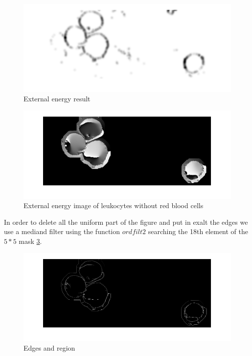 \begin{figure}
	\begin{center}
		\centering
		\includegraphics[scale=0.5]{img/Eext.png}
		\caption{External energy result}
		\label{fig:Eextforce}
	\end{center}
\end{figure}
\begin{figure}
	\begin{center}
		\centering
		\includegraphics[scale=0.5]{img/onlyleuco.png}
		\caption{External energy image of leukocytes without red blood cells}
		\label{fig:onlyleu}
	\end{center}
\end{figure}
\bigskip

In order to delete all the uniform part of the figure and put in exalt the edges we use a mediand filter using the function $ordfilt2$ searching the 18th element of the $5 * 5$ mask \ref{fig:Pmedonlyleu}.

\begin{figure}
	\begin{center}
		\centering
		\includegraphics[scale=0.5]{img/Pmedonlyleuko.png}
		\caption{Edges and region}
		\label{fig:Pmedonlyleu}
	\end{center}
\end{figure}
